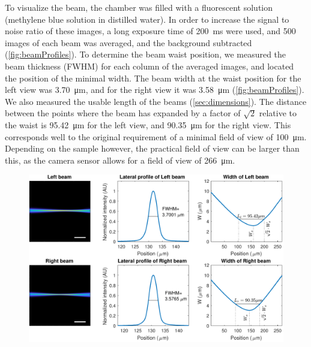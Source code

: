     To visualize the beam, the chamber was filled with a fluorescent solution (methylene blue solution in distilled water). In order to increase the signal to noise ratio of these images, a long exposure time of \SI{200}{ms} were used, and 500 images of each beam was averaged, and the background subtracted (\autoref{fig:beamProfiles}).
    To determine the beam waist position, we measured the beam thickness (FWHM) for each column of the averaged images, and located the position of the minimal width. The beam width at the waist position for the left view was   \SI{3.70}{\micro m}, and for the right view it was \SI{3.58}{\micro m} (\autoref{fig:beamProfiles}). We also measured the usable length of the beams (\ref{sec:dimensions}). The distance between the points where the beam has expanded by a factor of $\sqrt2$ relative to the waist is \SI{95.42}{\micro m} for the left view, and \SI{90.35}{\micro m} for the right view. This corresponds well to the original requirement of a minimal field of view of \SI{100}{\micro m}. Depending on the sample however, the practical field of view can be larger than this, as the camera sensor allows for a field of view of \SI{266}{\micro m}.  

    \begin{figure}[htb]
      \centering
      \includegraphics[width=\textwidth]{beamPlots.pdf}
      \label{fig:beamProfiles}
    \end{figure}


